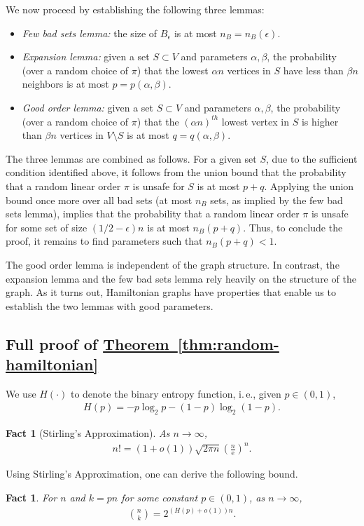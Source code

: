 \documentclass[11pt]{article}
\numberwithin{equation}{section}
\newtheorem{fact}[theorem]{Fact}
\theoremstyle{definition}
\theoremstyle{plain}
\newcommand{\eee}{\mathrm e}
\newcommand{\ie}{i.\,e.}
\newcommand{\expref}[2]{\hyperref[#2]{#1~\ref{#2}}}
\theoremstyle{plain}
\begin{document}
We now proceed by establishing the following three lemmas:
\begin{itemize}
	\item \emph{Few bad sets lemma:} the size of $B_\epsilon$ is at most $n_B=n_B(\epsilon)$.
	\item \emph{Expansion lemma:}
	given a set $S \subset V$ and parameters $\alpha, \beta$, the probability (over a random choice of $\pi$) that the lowest $\alpha n$ vertices in $S$ have less than $\beta n$ neighbors is at most $p=p(\alpha,\beta)$.
	\item \emph{Good order lemma:} given a set $S \subset V$ and parameters $\alpha, \beta$, the probability (over a random choice of $\pi$) that the $(\alpha n)^{th}$ lowest vertex in $S$ is higher than $\beta n$ vertices in $V \setminus S$ is at most $q=q(\alpha,\beta)$.
\end{itemize}

The three lemmas are combined as follows.
For a given set $S$, due to the sufficient condition identified above, it follows from the union bound that the probability that a
%
random linear order $\pi$ is unsafe for $S$ is at most $p+q$.
Applying the union bound once more over all bad sets (at most $n_B$ sets, as implied by the few bad sets lemma), implies that the probability that a
%
random linear order $\pi$ is unsafe for some set of size $(1/2-\epsilon)n$ is at most $n_B(p+q)$.
Thus, to conclude the proof, it remains to find parameters such that $n_B(p+q) < 1$.

The good order lemma is independent of the graph structure.
In contrast, the expansion lemma and the few bad sets lemma rely heavily on the structure of the graph.
As it turns out, Hamiltonian graphs have properties that enable us to establish the two lemmas with good parameters.


\subsection{Full proof of \expref{Theorem}{thm:random-hamiltonian}}\label{sec:app-hamiltonian}


We use $H(\cdot)$ to denote the binary entropy function, %
\ie, given $p\in (0,1)$, \begin{eqnarray}H(p)=-p\log_2 p-(1-p)\log_2(1-p).
\end{eqnarray}

\begin{fact}[Stirling's Approximation]
	As $n\rightarrow\infty$, 
\begin{eqnarray}n!=(1+o(1))\sqrt{2\pi n}\left(\frac{n}{\eee}\right)^n.
		\end{eqnarray}
\end{fact}
Using Stirling's Approximation, one can derive the following bound.
\begin{fact}\label{fact:binom_estimate}
  For $n$ and $k=pn$ for some
constant %
%
$p\in (0,1)$, as $n\rightarrow\infty$,
	\begin{eqnarray}
	\binom{n}{k}=2^{(H(p)+o(1))n}.\label{eq:binom_approx}
	\end{eqnarray}
\end{fact}
\end{document}
